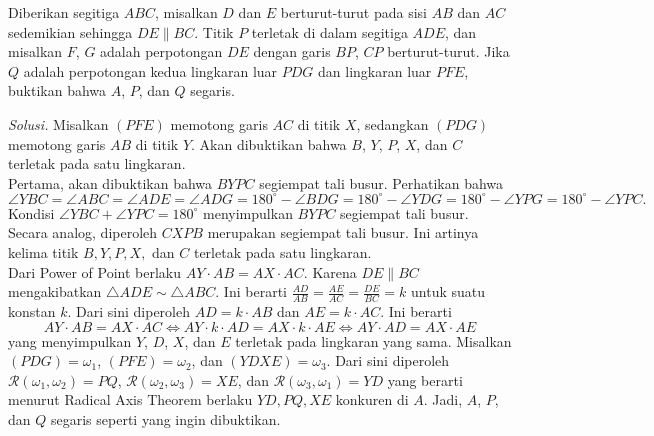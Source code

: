 \documentclass[12pt]{scrartcl}
\begin{document}
\newpage
\begin{tcolorbox}[title=\textbf{Soal 10}]
Diberikan segitiga $ABC$, misalkan $D$ dan $E$ berturut-turut pada sisi $AB$ dan $AC$ sedemikian sehingga $DE\parallel BC$. Titik $P$ terletak di dalam segitiga $ADE$, dan misalkan $F$, $G$ adalah perpotongan $DE$ dengan garis $BP$, $CP$ berturut-turut. Jika $Q$ adalah perpotongan kedua lingkaran luar $PDG$ dan lingkaran luar $PFE$, buktikan bahwa $A$, $P$, dan $Q$ segaris. 
\end{tcolorbox}
\noindent\textit{Solusi.} Misalkan $(PFE)$ memotong garis $AC$ di titik $X$, sedangkan $(PDG)$ memotong garis $AB$ di titik $Y$. Akan dibuktikan bahwa $B$, $Y$, $P$, $X$, dan $C$ terletak pada satu lingkaran. \\
Pertama, akan dibuktikan bahwa $BYPC$ segiempat tali busur. Perhatikan bahwa
\[\angle YBC = \angle ABC = \angle ADE =  \angle ADG = 180^\circ - \angle BDG = 180^\circ - \angle YDG = 180^\circ - \angle YPG=180^\circ-\angle YPC.\]
Kondisi $\angle YBC+\angle YPC=180^\circ$ menyimpulkan $BYPC$ segiempat tali busur. Secara analog, diperoleh $CXPB$ merupakan segiempat tali busur. Ini artinya kelima titik $B,Y,P,X,$ dan $C$ terletak pada satu lingkaran.\\
Dari Power of Point berlaku $AY\cdot AB=AX\cdot AC$. Karena $DE\parallel BC$ mengakibatkan $\triangle ADE\sim \triangle ABC$. Ini berarti $\frac{AD}{AB}=\frac{AE}{AC}=\frac{DE}{BC}=k$ untuk suatu konstan $k$. Dari sini diperoleh $AD=k\cdot AB$ dan $AE=k\cdot AC$. Ini berarti
\[AY\cdot AB=AX\cdot AC\iff AY\cdot k\cdot AD = AX\cdot k\cdot AE\iff AY\cdot AD = AX\cdot AE\]
yang menyimpulkan $Y$, $D$, $X$, dan $E$ terletak pada lingkaran yang sama. Misalkan $(PDG)=\omega_1$, $(PFE)=\omega_2$, dan $(YDXE)=\omega_3$. Dari sini diperoleh $\mathcal{R}(\omega_1,\omega_2)=PQ$, $\mathcal{R}(\omega_2,\omega_3)=XE$, dan $\mathcal{R}(\omega_3,\omega_1)=YD$ yang berarti menurut Radical Axis Theorem berlaku $YD,PQ,XE$ konkuren di $A$. Jadi, $A$, $P$, dan $Q$ segaris seperti yang ingin dibuktikan.
\begin{center}
\end{center}
\end{document}
